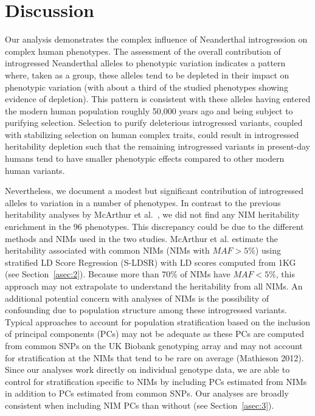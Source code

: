 \section{Discussion}
Our analysis demonstrates the complex influence of Neanderthal introgression on complex human phenotypes. The assessment of the overall contribution of introgressed Neanderthal alleles to phenotypic variation indicates a pattern where, taken as a group, these alleles tend to be depleted in their impact on phenotypic variation (with about a third of the studied phenotypes showing evidence of depletion). This pattern is consistent with these alleles having entered the modern human population roughly 50,000 years ago and being subject to purifying selection. Selection to purify deleterious introgressed variants, coupled with stabilizing selection on human complex traits, could result in introgressed heritability depletion such that the remaining introgressed variants in present-day humans tend to have smaller phenotypic effects compared to other modern human variants. 

Nevertheless, we document a modest but significant contribution of introgressed alleles to variation in a number of phenotypes. In contrast to the previous heritability analyses by McArthur et al.~\cite{mcarthur2021quantifying}, we did not find any NIM heritability enrichment in the 96 phenotypes. This discrepancy could be due to the different methods and NIMs used in the two studies. McArthur et al. estimate the heritability associated with common NIMs (NIMs with $MAF > 5\%$) using stratified LD Score Regression (S-LDSR) with LD scores computed from 1KG (see Section~\ref{asec:2}). Because more than 70\% of NIMs have $MAF < 5\%$, this approach may not extrapolate to understand the heritability from all NIMs. An additional potential concern with analyses of NIMs is the possibility of confounding due to population structure among these introgressed variants. Typical approaches to account for population stratification based on the inclusion of principal components (PCs) may not be adequate as these PCs are computed from common SNPs on the UK Biobank genotyping array and may not account for stratification at the NIMs that tend to be rare on average (Mathieson 2012). Since our analyses work directly on individual genotype data, we are able to control for stratification specific to NIMs by including PCs estimated from NIMs in addition to PCs estimated from common SNPs. Our analyses are broadly consistent when including NIM PCs than without (see Section~\ref{asec:3}). 

